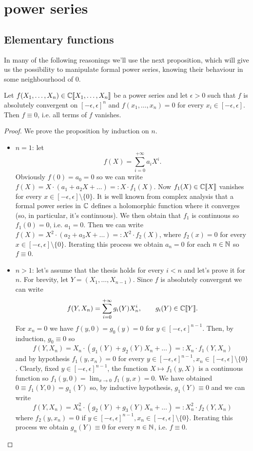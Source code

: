 \chapter{\padic power series}
	\section{Elementary functions}
		In many of the following reasonings we'll use the next proposition, which will give us the possibility to manipulate formal power series, knowing their behaviour in some neighbourhood of $0$.
		\begin{prop}
			\label{prop:formal-series}
			Let $f(X_1, \dots, X_n) \in \mathbb{C}\llbracket X_1, \dots, X_n \rrbracket$ be a power series and  let $\epsilon > 0$ such that $f$ is absolutely convergent on $[-\epsilon, \epsilon]^n$ and $f(x_1, \dots, x_n) = 0$ for every $x_i \in [-\epsilon, \epsilon]$. Then $f \equiv 0$, i.e. all terms of $f$ vanishes.
		\end{prop}
		\begin{proof}
			We prove the proposition by induction on $n$.
			\begin{itemize}
				\item $n=1$: let 
				\[
					f(X) = \sum_{i=0}^{+\infty} a_iX^i.
				\]
				Obviously $f(0) = a_0 = 0$ so we can write $f(X) = X \cdot(a_1 + a_2X + \dots) =: X \cdot f_1(X)$. Now $f_1(X) \in \mathbb{C}\llbracket X \rrbracket$ vanishes for every $x \in [-\epsilon, \epsilon] \setminus \{0\}$. It is well known from complex analysis that a formal power series in $\mathbb{C}$ defines a holomorphic function where it converges (so, in particular, it's continuous). We then obtain that $f_1$ is continuous so $f_1(0) = 0$, i.e. $a_1 = 0$. Then we can write $f(X) = X^2 \cdot (a_2 + a_3X + \dots) =: X^2 \cdot f_2(X)$, where $f_2(x) = 0$ for every $x \in [-\epsilon, \epsilon] \setminus \{0\}$. Iterating this process we obtain $a_n = 0$ for each $n \in \mathbb{N}$ so $f \equiv 0$.
				\item $n>1$: let's assume that the thesis holds for every $i < n$ and let's prove it for $n$. For brevity, let $Y = (X_1, \dots, X_{n-1})$. Since $f$ is absolutely convergent we can write 
				\[
					f(Y, X_n) = \sum_{i=0}^{+\infty} g_i(Y)X_n^i, \qquad g_i(Y) \in \mathbb{C}\llbracket Y \rrbracket.
				\]
				For $x_n = 0$ we have $f(y, 0) = g_0(y) = 0$ for $y \in [-\epsilon, \epsilon]^{n-1}$. Then, by induction, $g_0 \equiv 0$ so
				\[
					f(Y, X_n) = X_n \cdot (g_1(Y) + g_2(Y)X_n + \dots) =: X_n \cdot f_1(Y, X_n)
				\]
				and by hypothesis $f_1(y, x_n) = 0$ for every $y \in [-\epsilon, \epsilon]^{n-1}, x_n \in [-\epsilon, \epsilon] \setminus \{0\}$. Clearly, fixed $y \in [-\epsilon, \epsilon]^{n-1}$, the function $X \mapsto f_1(y, X)$ is a continuous function so $f_1(y, 0) = \lim_{x \to 0} f_1(y, x) = 0$. We have obtained $0 \equiv f_1(Y, 0) = g_1(Y)$ so, by inductive hypothesis, $g_1(Y) \equiv 0$ and we can write
				\[
					f(Y, X_n) = X_n^2 \cdot (g_2(Y) + g_3(Y)X_n + \dots) =: X_n^2 \cdot f_2(Y, X_n)
				\]
				where $f_2(y, x_n) = 0$ if $y \in [-\epsilon, \epsilon]^{n-1}, x_n \in [-\epsilon, \epsilon] \setminus \{0\}$. Iterating this process we obtain $g_n(Y) \equiv 0$ for every $n \in \mathbb{N}$, i.e. $f \equiv 0$.
			\end{itemize}
		\end{proof}
